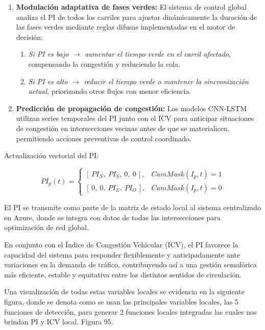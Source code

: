 \documentclass[12pt,a4paper,oneside]{report}
\begin{document}
\begin{enumerate}
\def\labelenumi{\arabic{enumi}.}
\item
  \textbf{Modulación adaptativa de fases verdes:} El sistema de control global analiza el PI de todos los carriles para ajustar dinámicamente la duración de las fases verdes mediante reglas difusas implementadas en el motor de decisión:

  \begin{enumerate}
  \def\labelenumii{\alph{enumii}.}
  \item
    \emph{Si PI es bajo \ensuremath{\rightarrow} aumentar el tiempo verde en el carril afectado}, compensando la congestión y reduciendo la cola.
  \item
    \emph{Si PI es alto \ensuremath{\rightarrow} reducir el tiempo verde o mantener la sincronización actual}, priorizando otros flujos con menor eficiencia.
  \end{enumerate}
\item
  \textbf{Predicción de propagación de congestión:} Los modelos CNN-LSTM utilizan series temporales del PI junto con el ICV para anticipar situaciones de congestión en intersecciones vecinas antes de que se materialicen, permitiendo acciones preventivas de control coordinado.
\end{enumerate}

Actualización vectorial del PI:

\begin{equation}
PI_{p}(t) =
\begin{cases}
\left[\, PI_{N},\ PI_{S},\ 0,\ 0 \,\right], & CamMask(I_{p},t) = 1\\[2pt]
\left[\, 0,\ 0,\ PI_{E},\ PI_{O} \,\right], & CamMask(I_{p},t) = 0
\end{cases}
\end{equation}

El PI se transmite como parte de la matriz de estado local al sistema centralizado en Azure, donde se integra con datos de todas las intersecciones para optimización de red global.

En conjunto con el Índice de Congestión Vehicular (ICV), el PI favorece la capacidad del sistema para responder flexiblemente y anticipadamente ante variaciones en la demanda de tráfico, contribuyendo así a una gestión semafórica más eficiente, estable y equitativa entre los distintos sentidos de circulación.

Una visualización de todas estas variables locales se evidencia en la siguiente figura, donde se denota como se usan las principales variables locales, las 5 funciones de detección, para generar 2 funciones locales integradas las cuales nos brindan PI y ICV local. Figura 95.
\end{document}
